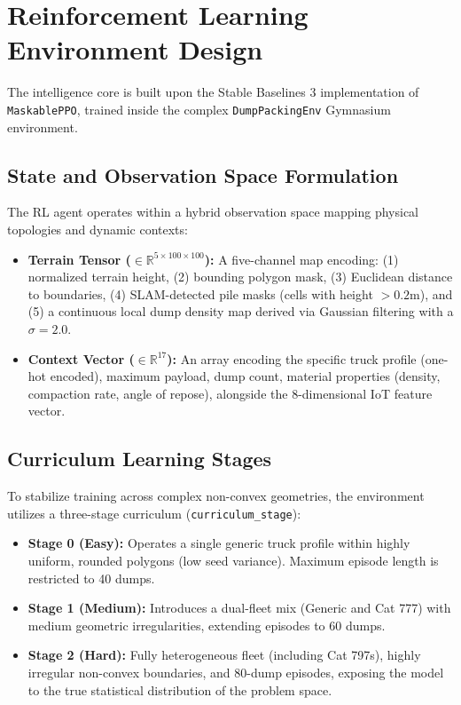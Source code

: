 \documentclass[conference]{IEEEtran}
\begin{document}
\section{Reinforcement Learning Environment Design}

The intelligence core is built upon the Stable Baselines 3 implementation of \texttt{MaskablePPO}, trained inside the complex \texttt{DumpPackingEnv} Gymnasium environment.

\subsection{State and Observation Space Formulation}
The RL agent operates within a hybrid observation space mapping physical topologies and dynamic contexts:
\begin{itemize}
    \item \textbf{Terrain Tensor ($\in \mathbb{R}^{5 \times 100 \times 100}$):} A five-channel map encoding: (1) normalized terrain height, (2) bounding polygon mask, (3) Euclidean distance to boundaries, (4) SLAM-detected pile masks (cells with height $> 0.2\text{m}$), and (5) a continuous local dump density map derived via Gaussian filtering with a $\sigma = 2.0$.
    \item \textbf{Context Vector ($\in \mathbb{R}^{17}$):} An array encoding the specific truck profile (one-hot encoded), maximum payload, dump count, material properties (density, compaction rate, angle of repose), alongside the 8-dimensional IoT feature vector.
\end{itemize}

\subsection{Curriculum Learning Stages}
To stabilize training across complex non-convex geometries, the environment utilizes a three-stage curriculum (\texttt{curriculum\_stage}):
\begin{itemize}
    \item \textbf{Stage 0 (Easy):} Operates a single generic truck profile within highly uniform, rounded polygons (low seed variance). Maximum episode length is restricted to 40 dumps.
    \item \textbf{Stage 1 (Medium):} Introduces a dual-fleet mix (Generic and Cat 777) with medium geometric irregularities, extending episodes to 60 dumps.
    \item \textbf{Stage 2 (Hard):} Fully heterogeneous fleet (including Cat 797s), highly irregular non-convex boundaries, and 80-dump episodes, exposing the model to the true statistical distribution of the problem space.
\end{itemize}
\end{document}
